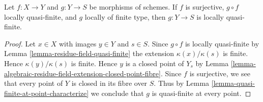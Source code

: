\begin{lemma}
\label{lemma-quasi-finite-local-source}
Let $f : X \to Y$ and $g : Y \to S$ be morphisms of schemes.
If $f$ is surjective, $g \circ f$ locally quasi-finite, and
$g$ locally of finite type, then $g : Y \to S$  is locally quasi-finite.
\end{lemma}

\begin{proof}
Let $x \in X$ with images $y \in Y$ and $s \in S$.
Since $g \circ f$ is locally quasi-finite by
Lemma \ref{lemma-residue-field-quasi-finite}
the extension $\kappa(x)/\kappa(s)$ is finite.
Hence $\kappa(y)/\kappa(s)$ is finite. Hence
$y$ is a closed point of $Y_s$ by
Lemma \ref{lemma-algebraic-residue-field-extension-closed-point-fibre}.
Since $f$ is surjective, we see that every point of $Y$ is
closed in its fibre over $S$. Thus by
Lemma \ref{lemma-quasi-finite-at-point-characterize}
we conclude that $g$ is quasi-finite at every point.
\end{proof}














